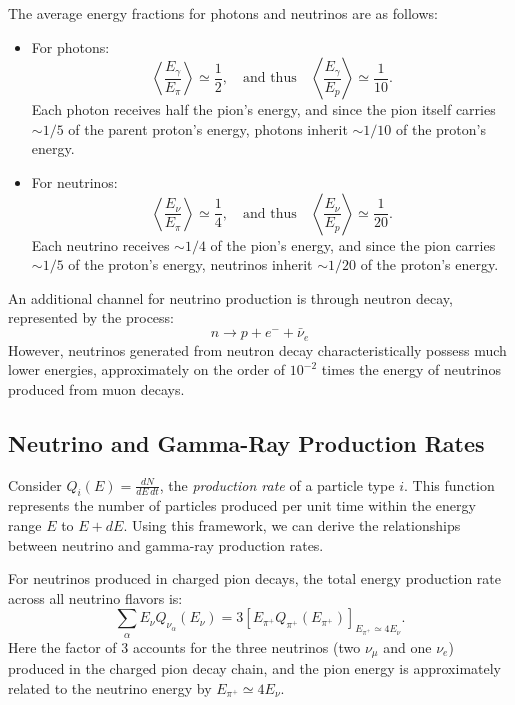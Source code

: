 The average energy fractions for photons and neutrinos are as follows:
%
\begin{itemize}
\item For photons:  
\begin{equation}
\left\langle \frac{E_\gamma}{E_\pi} \right\rangle \simeq \frac{1}{2}, \quad \text{and thus} \quad \left\langle \frac{E_\gamma}{E_p} \right\rangle \simeq \frac{1}{10}.
\end{equation}
Each photon receives half the pion's energy, and since the pion itself carries \(\sim 1/5\) of the parent proton's energy, photons inherit \(\sim 1/10\) of the proton’s energy.

\item For neutrinos:  
\begin{equation}
\left\langle \frac{E_\nu}{E_\pi} \right\rangle \simeq \frac{1}{4}, \quad \text{and thus} \quad \left\langle \frac{E_\nu}{E_p} \right\rangle \simeq \frac{1}{20}.
\end{equation}
Each neutrino receives \(\sim 1/4\) of the pion's energy, and since the pion carries \(\sim 1/5\) of the proton’s energy, neutrinos inherit \(\sim 1/20\) of the proton's energy.
\end{itemize}

An additional channel for neutrino production is through neutron decay, represented by the process:
%
\begin{equation}
n \rightarrow p + e^- + \bar\nu_e
\end{equation}
%
However, neutrinos generated from neutron decay characteristically possess much lower energies, approximately on the order of \(10^{-2}\) times the energy of neutrinos produced from muon decays.

\subsection{Neutrino and Gamma-Ray Production Rates}

Consider \( Q_i(E) = \frac{dN}{dE \, dt} \), the \emph{production rate} of a particle type \(i\). This function represents the number of particles produced per unit time within the energy range \(E\) to \(E + dE\). Using this framework, we can derive the relationships between neutrino and gamma-ray production rates.  

For neutrinos produced in charged pion decays, the total energy production rate across all neutrino flavors is:
\begin{equation}
\sum_\alpha E_\nu Q_{\nu_\alpha}(E_\nu) = 3 \left[ E_{\pi^+} Q_{\pi^+}(E_{\pi^+}) \right]_{E_{\pi^+} \simeq 4 E_\nu}.
\end{equation}
Here the factor of 3 accounts for the three neutrinos (two \(\nu_\mu\) and one \(\nu_e\)) produced in the charged pion decay chain, and the pion energy is approximately related to the neutrino energy by \(E_{\pi^+} \simeq 4 E_\nu\).  

